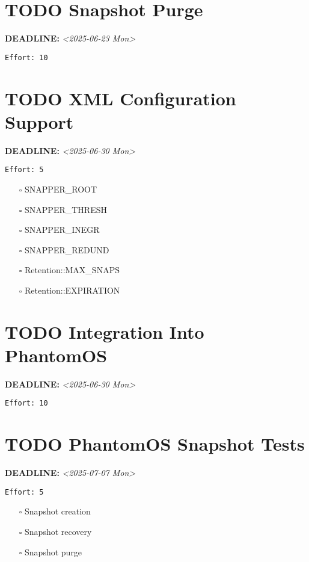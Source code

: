 \documentclass[11pt]{article}
\begin{document}
\section{{\bfseries\sffamily TODO}  Snapshot Purge}
\label{sec:org24e681a}
\noindent\textbf{DEADLINE:} \textit{<2025-06-23 Mon>}\\
\begin{verbatim}
Effort: 10
\end{verbatim}
\section{{\bfseries\sffamily TODO}  XML Configuration Support}
\label{sec:org406ed11}
\noindent\textbf{DEADLINE:} \textit{<2025-06-30 Mon>}\\
\begin{verbatim}
Effort: 5
\end{verbatim}
\begin{itemize}
\item[{$\square$}] SNAPPER\_ROOT
\item[{$\square$}] SNAPPER\_THRESH
\item[{$\square$}] SNAPPER\_INEGR
\item[{$\square$}] SNAPPER\_REDUND
\item[{$\square$}] Retention::MAX\_SNAPS
\item[{$\square$}] Retention::EXPIRATION
\end{itemize}
\section{{\bfseries\sffamily TODO}  Integration Into PhantomOS}
\label{sec:org019047f}
\noindent\textbf{DEADLINE:} \textit{<2025-06-30 Mon>}\\
\begin{verbatim}
Effort: 10
\end{verbatim}
\section{{\bfseries\sffamily TODO}  PhantomOS Snapshot Tests}
\label{sec:org05461c8}
\noindent\textbf{DEADLINE:} \textit{<2025-07-07 Mon>}\\
\begin{verbatim}
Effort: 5
\end{verbatim}
\begin{itemize}
\item[{$\square$}] Snapshot creation
\item[{$\square$}] Snapshot recovery
\item[{$\square$}] Snapshot purge
\end{itemize}
\end{document}
